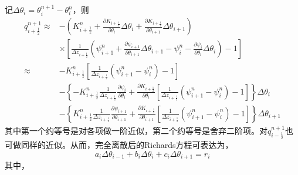 记$\Delta \theta_i=\theta_i^{n+1}-\theta_i^n$，则
\begin{equation}
\begin{split} 
q_{i+\frac{1}{2}}^{n+1} \approx &-\left(K_{i+\frac{1}{2}}^{n}+\frac{\partial K_{i+\frac{1}{2}}}{\partial \theta_{i}} \Delta \theta_{i} + \frac{\partial K_{i+\frac{1}{2}}}{\partial \theta_{i+1}} \Delta \theta_{i+1}\right)  \\
    & \times \left[\frac{1}{\Delta z_{i+\frac{1}{2}}}\left(\psi_{i+1}^{n}+\frac{\partial \psi_{i+1}}{\partial \theta_{i+1}} \Delta \theta_{i+1}-\psi_{i}^{n}-\frac{\partial \psi_{i}}
    {\partial \theta_{i}} \Delta \theta_{i}\right)-1\right] \\ 
    \approx & -K_{i+\frac{1}{2}}^{n}\left[\frac{1}{\Delta z_{i+\frac{1}{2}}}\left(\psi_{i+1}^{n}-\psi_{i}^{n}\right)-1\right] \\
    &-\left\{-K_{i+\frac{1}{2}}^{n} \frac{1}{\Delta z_{i+\frac{1}{2}}} \frac{\partial \psi_{i}}{\partial \theta_{i}}+\frac{\partial K_{i+\frac{1}{2}}}{\partial 
     \theta_{i}}\left[\frac{1}{\Delta z_{i+\frac{1}{2}}}\left(\psi_{i+1}^{n}-\psi_{i}^{n}\right)-1\right]\right\} \Delta \theta_{i} \\ 
    &-\left\{K_{i+\frac{1}{2}}^{n} \frac{1}{\Delta z_{i+\frac{1}{2}}} \frac{\partial \psi_{i+1}}{\partial \theta_{i+1}}+\frac{\partial K_{i+\frac{1}{2}}}{\partial
      \theta_{i+1}}\left[\frac{1}{\Delta z_{i+\frac{1}{2}}}\left(\psi_{i+1}^{n}-\psi_{i}^{n}\right)-1\right]\right\} \Delta \theta_{i+1} 
\end{split}
\end{equation}
其中第一个约等号是对各项做一阶近似，第二个约等号是舍弃二阶项。对$q_{i-\frac{1}{2}}^{n+1}$也可做同样的近似。从而，完全离散后的Richards方程可表达为，
\begin{equation}
a_i \Delta \theta_{i-1}+b_i \Delta \theta_{i}+c_i \Delta \theta_{i+1}=r_i
\end{equation}
其中，
